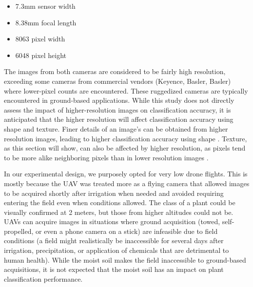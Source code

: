 \documentclass[letterpaper, notitlepage]{report}
\begin{document}
\begin{itemize}
	\item{7.3mm sensor width}
	\item{8.38mm focal length}
	\item{8063 pixel width}
	\item{6048 pixel height}
\end{itemize}

The images from both cameras are considered to be fairly high resolution, exceeding some cameras from commercial vendors (Keyence, Basler, Basler) where lower-pixel counts are encountered. These ruggedized cameras are typically encountered in ground-based applications. While this study does not directly assess the impact of higher-resolution images on classification accuracy, it is anticipated that the higher resolution will affect classification accuracy using shape and texture. Finer details of an image's can be obtained from higher resolution images, leading to higher classification accuracy using shape \parencite{Kroner2013-rm}. Texture, as this section will show, can also be affected by higher resolution, as pixels tend to be more alike neighboring pixels than in lower resolution images \parencite{Kupidura2022-xe}. 

In our experimental design, we purposely opted for very low drone flights. This is mostly because the \gls{UAV} was treated more as a flying camera that allowed images to be acquired shortly after irrigation when needed and avoided requiring entering the field even when conditions allowed. The class of a plant could be visually confirmed at 2 meters, but those from higher altitudes could not be. UAVs can acquire images in situations where ground acquisition (towed, self-propelled, or even a phone camera on a stick) are infeasible due to field conditions (a field might realistically be inaccessible for several days after irrigation, precipitation, or application of chemicals that are detrimental to human health). While the moist soil makes the field inaccessible to ground-based acquisitions, it is not expected that the moist soil has an impact on plant classification performance.
\end{document}
